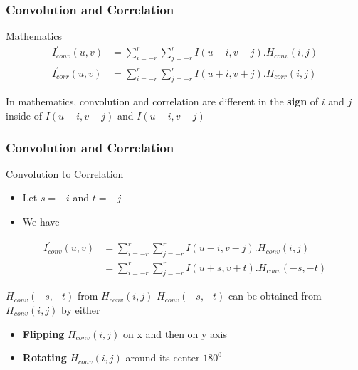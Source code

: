 \documentclass[english,11pt,table,handout]{beamer}
\begin{document}
\frame
{
	\frametitle{Convolution and Correlation}
	
	\begin{block}{Mathematics}
		\begin{equation*} 
		\begin{split}
		I_{conv}^{'}{(u,v)} &= \sum_{i=-r}^{r}{\sum_{j=-r}^{r}{I(u-i, v-j).H_{conv}{(i,j)}}} \\
		I_{corr}^{'}{(u,v)} &= \sum_{i=-r}^{r}{\sum_{j=-r}^{r}{I(u+i, v+j).H_{corr}{(i,j)}}}
		\end{split}
		\end{equation*}
	\end{block}
	In mathematics, convolution and correlation are different in the \textbf{sign} of $i$ and $j$ inside of $I(u+i, v+j)$ and $I(u-i, v-j)$
}
\frame
{
	\frametitle{Convolution and Correlation}
	
	\begin{block}{Convolution to Correlation}
		\begin{itemize}
			\item Let $s=-i$ and $t=-j$ 
			\item We have
		\end{itemize}
		\begin{equation*} 
		\begin{split}
		I_{conv}^{'}{(u,v)} &= \sum_{i=-r}^{r}{\sum_{j=-r}^{r}{I(u-i, v-j).H_{conv}{(i,j)}}} \\
				&= \sum_{i=-r}^{r}{\sum_{j=-r}^{r}{I(u+s, v+t).H_{conv}{(-s,-t)}}} 
		\end{split}
		\end{equation*}
	\end{block}
	\begin{alertblock}{$H_{conv}{(-s,-t)}$ from $H_{conv}{(i,j)}$}
		$H_{conv}{(-s,-t)}$ can be obtained from $H_{conv}{(i,j)}$ by either
			\begin{itemize}
				\item \textbf{Flipping} $H_{conv}{(i,j)}$ on x and then on y axis
				\item \textbf{Rotating} $H_{conv}{(i,j)}$ around its center $180^0$
			\end{itemize}
	\end{alertblock}
	
}
\frame
\end{document}
